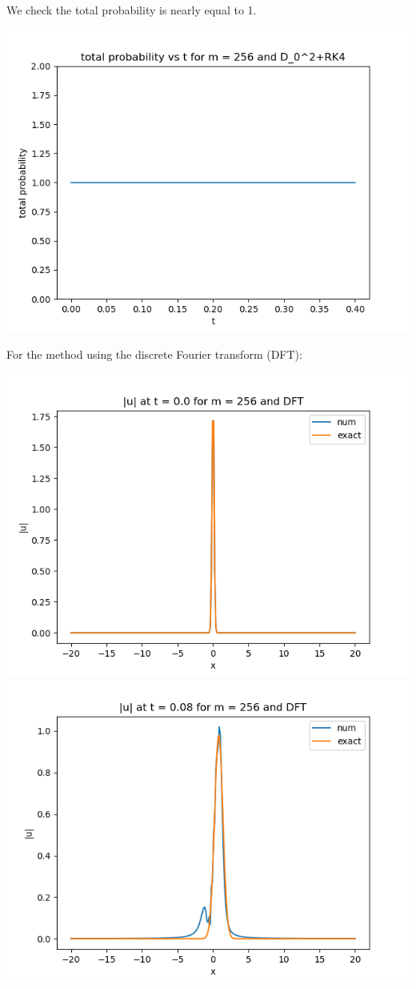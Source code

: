 \documentclass{article}
\begin{document}
\begin{enumerate}[label=(\alph*)]
\begin{center}
\end{center}
We check the total probability is nearly equal to 1.
\begin{center}
	\includegraphics[scale=.5]{FINAL prob m = 256 D02+RK4}
\end{center}
For the method using the discrete Fourier transform (DFT):
\begin{center}
	\includegraphics[scale=.3]{FINAL u_abs t = 0.0 m = 256 DFT}
	\includegraphics[scale=.3]{FINAL u_abs t = 0.08 m = 256 DFT}

\end{center}
\end{enumerate}
\end{document}

